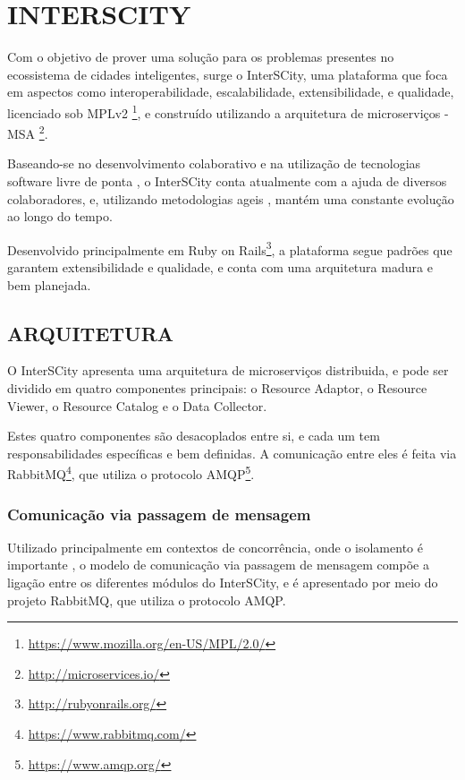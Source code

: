 \chapter[INTERSCITY]{INTERSCITY}

Com o objetivo de prover uma solução para os problemas presentes no ecossistema
de cidades inteligentes, surge o InterSCity, uma plataforma que foca em
aspectos como interoperabilidade, escalabilidade, extensibilidade, e qualidade,
licenciado sob
MPLv2 \footnote{\url{https://www.mozilla.org/en-US/MPL/2.0/}}, e construído
utilizando a arquitetura de microserviços -
MSA \footnote{\url{http://microservices.io/}}.

Baseando-se no desenvolvimento colaborativo e na utilização de tecnologias
software livre de ponta \cite{delesposte2017}, o InterSCity conta atualmente
com a ajuda de diversos colaboradores, e, utilizando metodologias ageis
\cite{delesposte2017}, mantém uma constante evolução ao longo do tempo.

Desenvolvido principalmente em
Ruby on Rails\footnote{\url{http://rubyonrails.org/}},
a plataforma segue padrões que garantem extensibilidade e qualidade, e
conta com uma arquitetura madura e bem planejada.

\section{ARQUITETURA}

O InterSCity apresenta uma arquitetura de microserviços distribuida, e pode
ser dividido em quatro componentes principais: o Resource Adaptor, o Resource
Viewer, o Resource Catalog e o Data Collector.

Estes quatro componentes são desacoplados entre si, e cada um tem
responsabilidades específicas e bem definidas. A comunicação entre eles é
feita via RabbitMQ\footnote{\url{https://www.rabbitmq.com/}}, que utiliza o
protocolo AMQP\footnote{\url{https://www.amqp.org/}}.

\subsection{Comunicação via passagem de mensagem}

Utilizado principalmente em contextos de concorrência, onde o isolamento é
importante \cite{armstrong2003}, o modelo de comunicação via passagem de
mensagem compõe a ligação entre os diferentes módulos do InterSCity, e é
apresentado por meio do projeto RabbitMQ, que utiliza o protocolo AMQP.

